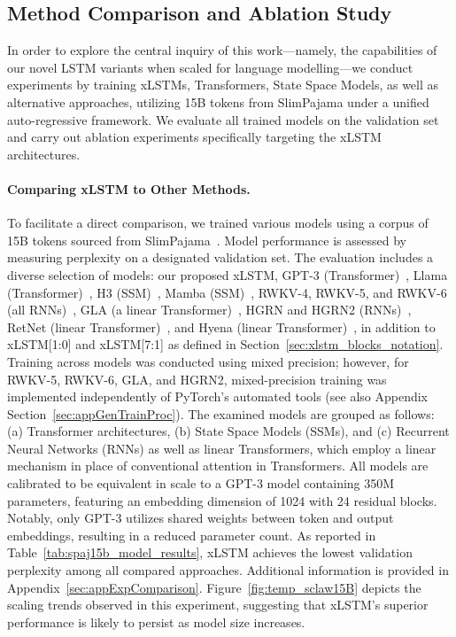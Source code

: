 \subsection{Method Comparison and Ablation Study}
\label{sec:ExpComparison}

In order to explore the central inquiry of this work—namely, the capabilities of our novel LSTM variants when scaled for language modelling—we conduct experiments by training xLSTMs, Transformers, State Space Models, as well as alternative approaches, utilizing 15B tokens from SlimPajama under a unified auto-regressive framework. We evaluate all trained models on the validation set and carry out ablation experiments specifically targeting the xLSTM architectures.

\paragraph{Comparing xLSTM to Other Methods.} To facilitate a direct comparison, we trained various models using a corpus of 15B tokens sourced from SlimPajama~\citep{Soboleva:23}. Model performance is assessed by measuring perplexity on a designated validation set. The evaluation includes a diverse selection of models: our proposed xLSTM, GPT-3 (Transformer)~\citep{Brown:20short}, Llama (Transformer)~\citep{Touvron:23arxiv}, H3 (SSM)~\citep{Fu:23}, Mamba (SSM)~\citep{Gu:24arxiv}, RWKV-4, RWKV-5, and RWKV-6 (all RNNs)~\citep{Peng:23arxivshort, Peng:24arxivshort}, GLA (a linear Transformer)~\citep{Yang:23arxiv}, HGRN and HGRN2 (RNNs)~\citep{Qin:23, Qin:24arxiv}, RetNet (linear Transformer)~\citep{Sun:23arxiv}, and Hyena (linear Transformer)~\citep{Poli:23}, in addition to xLSTM[1:0] and xLSTM[7:1] as defined in Section~\ref{sec:xlstm_blocks_notation}. Training across models was conducted using mixed precision; however, for RWKV-5, RWKV-6, GLA, and HGRN2, mixed-precision training was implemented independently of PyTorch’s automated tools (see also Appendix Section~\ref{sec:appGenTrainProc}). The examined models are grouped as follows: (a) Transformer architectures, (b) State Space Models (SSMs), and (c) Recurrent Neural Networks (RNNs) as well as linear Transformers, which employ a linear mechanism in place of conventional attention in Transformers. All models are calibrated to be equivalent in scale to a GPT-3 model containing 350M parameters, featuring an embedding dimension of 1024 with 24 residual blocks. Notably, only GPT-3 utilizes shared weights between token and output embeddings, resulting in a reduced parameter count. As reported in Table~\ref{tab:spaj15b_model_results}, xLSTM achieves the lowest validation perplexity among all compared approaches. Additional information is provided in Appendix~\ref{sec:appExpComparison}. Figure~\ref{fig:temp_sclaw15B} depicts the scaling trends observed in this experiment, suggesting that xLSTM’s superior performance is likely to persist as model size increases.

